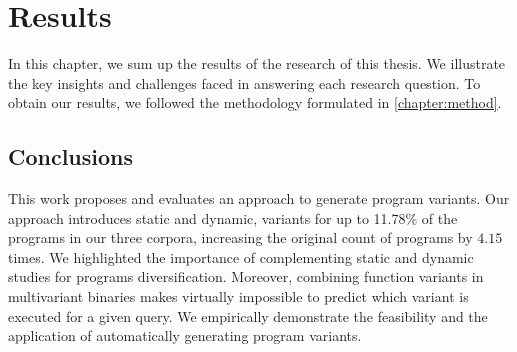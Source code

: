 \chapter{Results} 

In this chapter, we sum up the results of the research of this thesis.  We illustrate the key insights and challenges faced in answering each research question.  To obtain our results, we followed the methodology formulated in \autoref{chapter:method}.







\section*{Conclusions}

This work proposes and evaluates an approach to generate \wasm program variants. Our approach introduces static and dynamic, variants for up to 11.78\% of the programs in our three corpora, increasing the original count of programs by $4.15$ times. We highlighted the importance of complementing static and dynamic studies for programs diversification. Moreover, combining function variants in multivariant binaries makes virtually impossible to predict which variant is executed for a given query. We empirically demonstrate the feasibility and the application of automatically generating \wasm program variants.

